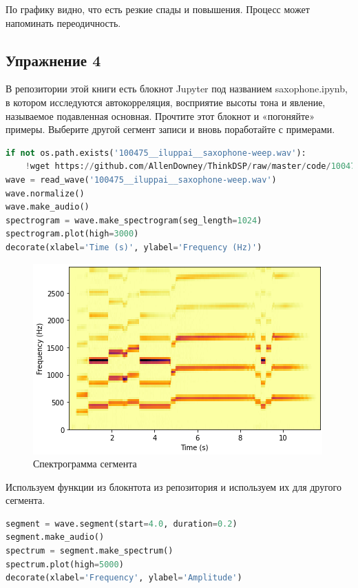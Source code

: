По графику видно, что есть резкие спады и повышения. Процесс может напоминать переодичность.

\subsection{Упражнение 4}

В репозитории этой книги есть блокнот Jupyter под названием saxophone.ipynb, в котором исследуются автокорреляция, восприятие высоты тона и явление, называемое подавленная основная. Прочтите этот блокнот и «погоняйте» примеры. Выберите другой сегмент записи и вновь поработайте с примерами.

\begin{lstlisting}[language=Python]
if not os.path.exists('100475__iluppai__saxophone-weep.wav'):
    !wget https://github.com/AllenDowney/ThinkDSP/raw/master/code/100475__iluppai__saxophone-weep.wav
wave = read_wave('100475__iluppai__saxophone-weep.wav')
wave.normalize()
wave.make_audio()
spectrogram = wave.make_spectrogram(seg_length=1024)
spectrogram.plot(high=3000)
decorate(xlabel='Time (s)', ylabel='Frequency (Hz)')
\end{lstlisting}
\begin{figure}[H]
	\begin{center}
		\includegraphics[scale=1]{fig/lab05/lab5_7.png}
		\caption{Спектрограмма сегмента}
	\end{center}
\end{figure}

Используем функции из блокнтота из репозитория и используем их для другого сегмента.

\begin{lstlisting}[language=Python]
segment = wave.segment(start=4.0, duration=0.2)
segment.make_audio()
spectrum = segment.make_spectrum()
spectrum.plot(high=5000)
decorate(xlabel='Frequency', ylabel='Amplitude')
\end{lstlisting}


